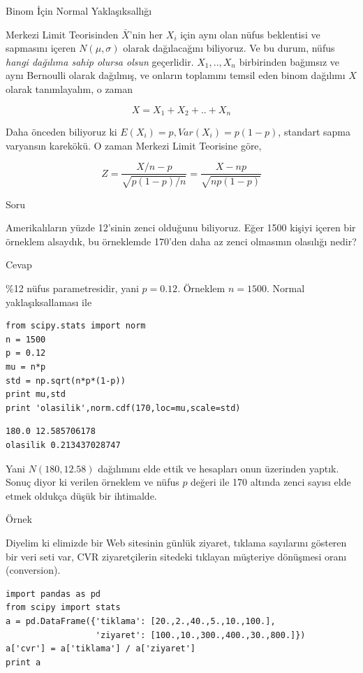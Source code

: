 \documentclass[12pt,fleqn]{article}\usepackage{../../common}
\begin{document}
Binom İçin Normal Yaklaşıksallığı

Merkezi Limit Teorisinden $\bar{X}$'nin her $X_i$ için aynı olan nüfus
beklentisi ve sapmasını içeren $N(\mu,\sigma)$ olarak dağılacağını
biliyoruz. Ve bu durum, nüfus {\em hangi dağılıma sahip olursa olsun}
geçerlidir. $X_1,..,X_n$ birbirinden bağımsız ve aynı Bernoulli olarak
dağılmış, ve onların toplamını temsil eden binom dağılımı $X$ olarak
tanımlayalım, o zaman

$$ X = X_1 + X_2 + .. +  X_n $$

Daha önceden biliyoruz ki $E(X_i) = p, Var(X_i) = p(1-p)$, standart sapma
varyansın karekökü. O zaman Merkezi Limit Teorisine göre, 

$$ 
Z = 
\frac{X/n - p}{\sqrt{p(1-p)/n}} =
\frac{X - np}{\sqrt{np(1-p)}}
$$

Soru

Amerikalıların yüzde 12'sinin zenci olduğunu biliyoruz. Eğer 1500 kişiyi
içeren bir örneklem alsaydık, bu örneklemde 170'den daha az zenci
olmasının olasılığı nedir? 

Cevap

\%12 nüfus parametresidir, yani $p=0.12$. Örneklem $n=1500$. Normal
yaklaşıksallaması ile 

\begin{verbatim}
from scipy.stats import norm
n = 1500
p = 0.12
mu = n*p
std = np.sqrt(n*p*(1-p))
print mu,std
print 'olasilik',norm.cdf(170,loc=mu,scale=std)
\end{verbatim}

\begin{verbatim}
180.0 12.585706178
olasilik 0.213437028747
\end{verbatim}

Yani $N(180,12.58)$ dağılımını elde ettik ve hesapları onun üzerinden
yaptık. Sonuç diyor ki verilen örneklem ve nüfus $p$ değeri ile 170 altında
zenci sayısı elde etmek oldukça düşük bir ihtimalde. 

Örnek

Diyelim ki elimizde bir Web sitesinin günlük ziyaret, tıklama sayılarını
gösteren bir veri seti var, CVR ziyaretçilerin sitedeki tıklayan müşteriye
dönüşmesi oranı (conversion). 

\begin{verbatim}
import pandas as pd
from scipy import stats
a = pd.DataFrame({'tiklama': [20.,2.,40.,5.,10.,100.],
                  'ziyaret': [100.,10.,300.,400.,30.,800.]})
a['cvr'] = a['tiklama'] / a['ziyaret'] 
print a
\end{verbatim}
\end{document}
